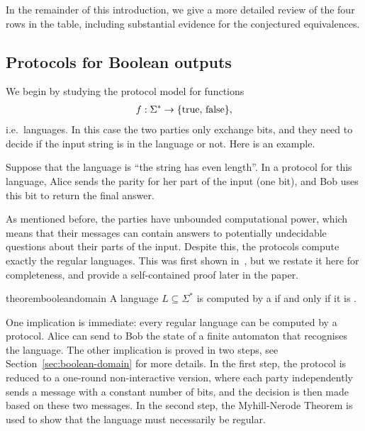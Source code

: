 In the remainder of this introduction, we give a more detailed review of the four rows
in the table, including substantial evidence for the conjectured equivalences.

\subsection{Protocols for Boolean outputs}
\label{sec:intro-boolean}

We begin by studying the protocol model for  functions
\begin{align*}
f : \Sigma^* \to \{\text{true, false}\},
\end{align*}
i.e.~languages. In this case the two parties only exchange bits, 
and they need to decide if the input string is in the language or not.
Here is an example.

\begin{myexample}[Parity]
    \label{ex:three-letters}
Suppose that the language is ``the string has even length''. In a protocol for this language, Alice sends the parity for her part of the input (one bit), and Bob uses this bit to return the final answer.  
\end{myexample}

As mentioned before, the parties have unbounded computational power, which means that  their messages
can contain answers to potentially undecidable questions about their parts of the input.
Despite this, the protocols compute exactly the regular languages.
This was first shown in~\cite[Theorem 5]{hauser1989}, but we restate it here for completeness, and provide a self-contained proof later in the paper.

\begin{restatable}{theorem}{booleandomain}
 \label{thm:boolean-domain} A language $L \subseteq \Sigma^*$ is computed by a  if and only if it is 
 .
\end{restatable}
One implication is immediate: every regular language can be computed by a protocol.  Alice can send to Bob the state of a finite automaton that recognises the language. The other implication is proved in two steps, see Section~\ref{sec:boolean-domain} for more details. In the first step, the protocol is reduced to a one-round non-interactive version, where each party independently sends a message with a constant number of bits, and the decision is then made based on these two messages. In the second step,  the Myhill-Nerode Theorem is used to show that the language must necessarily be regular. 


